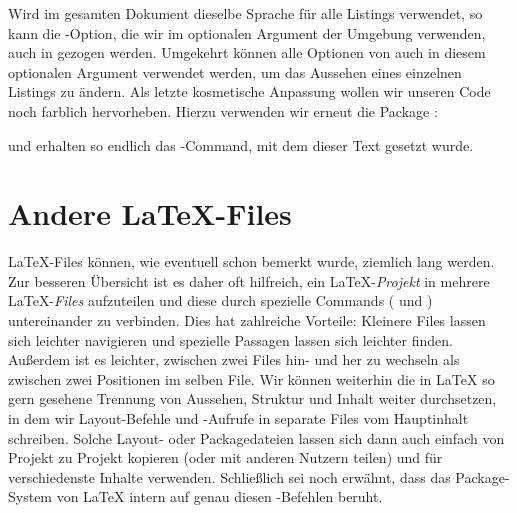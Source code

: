 \begin{latexlisting}
	\usepackage{listings}
	\usepackage{lstautogobble}
	\lstset{
	    basicstyle=\ttfamily\footnotesize,
		...,
		tabsize=4,
		autogobble,
	}
\end{latexlisting}
Wird im gesamten Dokument dieselbe Sprache für alle Listings verwendet, so kann die -Option, die wir im optionalen Argument der Umgebung verwenden, auch in  gezogen werden.
Umgekehrt können alle Optionen von  auch in diesem optionalen Argument verwendet werden, um das Aussehen eines einzelnen Listings zu ändern.
Als letzte kosmetische Anpassung wollen wir unseren Code noch farblich hervorheben.
Hierzu verwenden wir erneut die Package :
\begin{latexlisting}
	\usepackage{listings}
	\usepackage{lstautogobble}
	\usepackage{xcolor}
\end{latexlisting}
und erhalten so endlich das -Command, mit dem dieser Text gesetzt wurde.

\section{Andere \LaTeX{}-Files}
\LaTeX{}-Files können, wie eventuell schon bemerkt wurde, ziemlich lang werden.
Zur besseren Übersicht ist es daher oft hilfreich, ein \LaTeX{}-\emph{Projekt} in mehrere \LaTeX{}-\emph{Files} aufzuteilen und diese durch spezielle Commands ( und ) untereinander zu verbinden.
Dies hat zahlreiche Vorteile: Kleinere Files lassen sich leichter navigieren und spezielle Passagen lassen sich leichter finden.
Außerdem ist es leichter, zwischen zwei Files hin- und her zu wechseln als zwischen zwei Positionen im selben File.
Wir können weiterhin die in \LaTeX{} so gern gesehene Trennung von Aussehen, Struktur und Inhalt weiter durchsetzen, in dem wir Layout-Befehle und -Aufrufe in separate Files vom Hauptinhalt schreiben.
Solche Layout- oder Packagedateien lassen sich dann auch einfach von Projekt zu Projekt kopieren (oder mit anderen Nutzern teilen) und für verschiedenste Inhalte verwenden. 
Schließlich sei noch erwähnt, dass das Package-System von \LaTeX{} intern auf genau diesen -Befehlen beruht.

